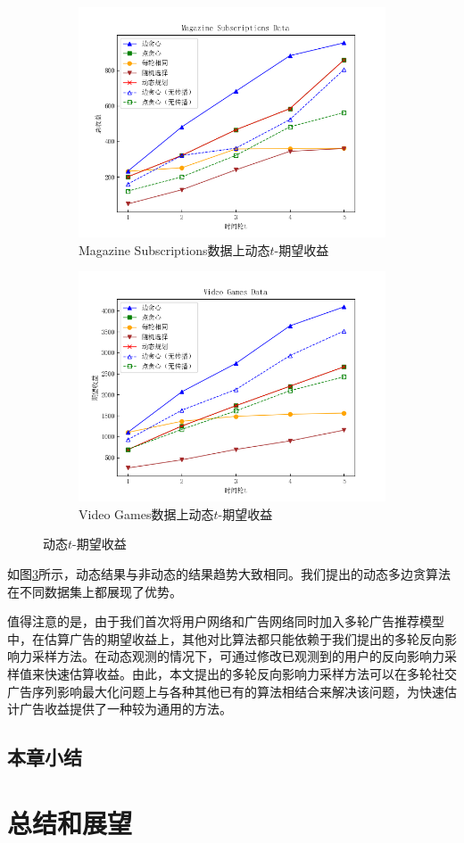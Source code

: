 \begin{figure}[th]
    \begin{subfigure}{0.45\textwidth}
       \includegraphics[width=\linewidth]{figure/sasim/adp/adp_cn_magazine}
        \caption{Magazine Subscriptions数据上动态$t$-期望收益}
        \label{fig:adp3}
    \end{subfigure}
    \hfill
    \begin{subfigure}{0.45\textwidth}
        \includegraphics[width=\linewidth]{figure/sasim/nonadp/non_cn_video}
        \caption{Video Games数据上动态$t$-期望收益}
        \label{fig:adp4}
    \end{subfigure}
    \caption{动态$t$-期望收益}
    \label{fig:adp}
\end{figure}

如图\ref{fig:adp}所示，动态结果与非动态的结果趋势大致相同。我们提出的动态多边贪算法在不同数据集上都展现了优势。

值得注意的是，由于我们首次将用户网络和广告网络同时加入多轮广告推荐模型中，在估算广告的期望收益上，其他对比算法都只能依赖于我们提出的多轮反向影响力采样方法。在动态观测的情况下，可通过修改已观测到的用户的反向影响力采样值来快速估算收益。由此，本文提出的多轮反向影响力采样方法可以在多轮社交广告序列影响最大化问题上与各种其他已有的算法相结合来解决该问题，为快速估计广告收益提供了一种较为通用的方法。


\section{本章小结}

\chapter{总结和展望}